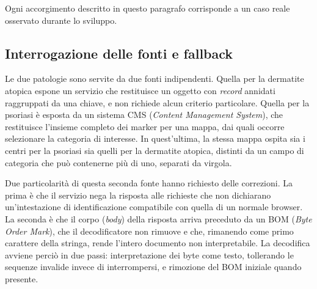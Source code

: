 Ogni accorgimento descritto in questo paragrafo corrisponde a un caso reale osservato durante lo sviluppo.

\subsection{Interrogazione delle fonti e fallback}\label{subsec:impl-endpoint}

Le due patologie sono servite da due fonti indipendenti.
Quella per la dermatite atopica espone un servizio che restituisce un oggetto con \textit{record} annidati raggruppati da una chiave, e non
richiede alcun criterio particolare.
Quella per la psoriasi è esposta da un sistema CMS (\textit{Content Management System}), che restituisce l'insieme completo dei marker per una
mappa, dai quali occorre selezionare la categoria di interesse.
In quest'ultima, la stessa mappa ospita sia i centri per la psoriasi sia quelli per la dermatite atopica, distinti da
un campo di categoria che può contenerne più di uno, separati da virgola.

Due particolarità di questa seconda fonte hanno richiesto delle correzioni.
La prima è che il servizio nega la risposta alle richieste che non dichiarano un'intestazione di identificazione compatibile con
quella di un normale browser. %
La seconda è che il corpo (\textit{body}) della risposta arriva preceduto da un BOM (\textit{Byte Order Mark}), che il decodificatore non rimuove e che,
rimanendo come primo carattere della stringa, rende l'intero documento non interpretabile.
La decodifica avviene perciò in due passi: interpretazione dei byte come testo, tollerando le sequenze invalide invece di interrompersi,
e rimozione del BOM iniziale quando presente.



